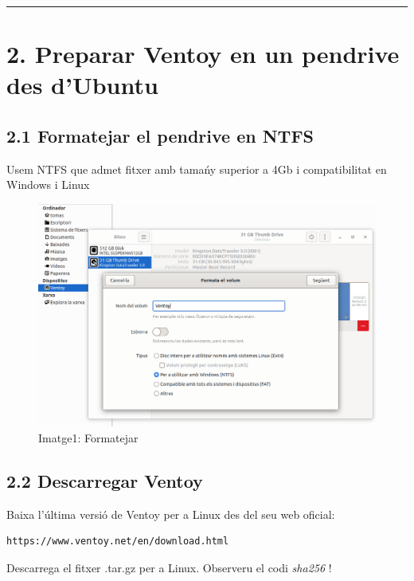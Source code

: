 \documentclass[
  12 pt,
  a4paper,
]{article}
\begin{document}
\begin{center}\rule{0.5\linewidth}{0.5pt}\end{center}

\newpage

\section{2. Preparar Ventoy en un pendrive des
d'Ubuntu}\label{preparar-ventoy-en-un-pendrive-des-dubuntu}

\subsection{2.1 Formatejar el pendrive en
NTFS}\label{formatejar-el-pendrive-en-ntfs}

Usem NTFS que admet fitxer amb tamańy superior a 4Gb i compatibilitat en
Windows i Linux

\begin{figure}
\centering
\includegraphics{png/formatar.png}
\caption{Imatge1: Formatejar}
\end{figure}

\subsection{2.2 Descarregar Ventoy}\label{descarregar-ventoy}

Baixa l'última versió de Ventoy per a Linux des del seu web oficial:

\begin{verbatim}
https://www.ventoy.net/en/download.html
\end{verbatim}

Descarrega el fitxer .tar.gz per a Linux. Observeru el codi
\emph{sha256} !
\end{document}
